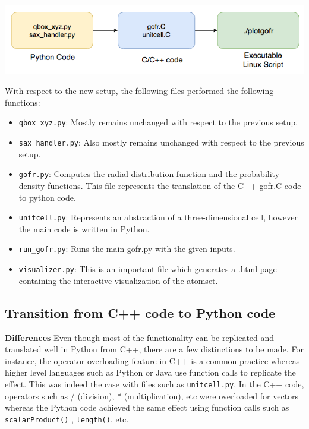\includegraphics[scale=0.30]{images/old_pipeline}\newline


With respect to the new setup, the following files performed the following functions: 

\begin{itemize}
        
    \item \verb|qbox_xyz.py|: Mostly remains unchanged with respect to the previous setup.
    
    \item \verb|sax_handler.py|: Also mostly remains unchanged with respect to the previous setup.

    \item \verb|gofr.py|: Computes the radial distribution function and the probability density functions. This file represents the translation of the C++ gofr.C code to python code. 
    
    \item \verb|unitcell.py|: Represents an abstraction of a three-dimensional cell, however the main code is written in Python.
    
    \item \verb|run_gofr.py|: Runs the main gofr.py with the given inputs.

    \item \verb|visualizer.py|: This is an important file which generates a .html page containing the interactive visualization of the atomset.
    
\end{itemize}



\subsection*{Transition from C++ code to Python code}


\textbf{Differences}
Even though most of the functionality can be replicated and translated well in Python from C++, there are a few distinctions to be made. For instance, the operator overloading feature in C++ is a common practice whereas higher level languages such as Python or Java use function calls to replicate the effect. This was indeed the case with files such as \verb|unitcell.py|. In the C++ code, operators such as / (division), * (multiplication), etc were overloaded for vectors whereas the Python code achieved the same effect using function calls such as \verb|scalarProduct()| , \verb|length()|, etc.

